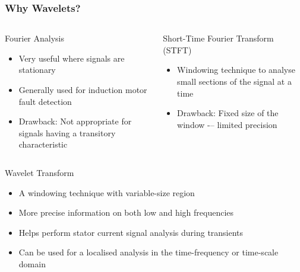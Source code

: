 \documentclass[9pt]{beamer}
\begin{document}
\begin{frame}
\frametitle{Why Wavelets?}

\begin{columns}
\begin{block}{Fourier Analysis}
    \begin{itemize}
    \item Very useful where signals are stationary 
    \item Generally used for induction motor fault detection
    \item \alert{Drawback}: Not appropriate for signals having a transitory characteristic
    \end{itemize}
\end{block}
\begin{block}{Short-Time Fourier Transform (STFT)} 
    \begin{itemize}
    \item Windowing technique to analyse small sections of the signal at a time
    \item \alert{Drawback}: Fixed size of the window -– limited precision
    \end{itemize}
\end{block}
\end{columns}

\begin{block}{Wavelet Transform}
    \begin{itemize}
    \item A windowing technique with variable-size region
    \item More precise information on both low and high frequencies
    \item Helps perform stator current signal analysis during transients
    \item Can be used for a localised analysis in the time-frequency or time-scale domain
    \end{itemize}
\end{block}
\end{frame}
\end{document}
